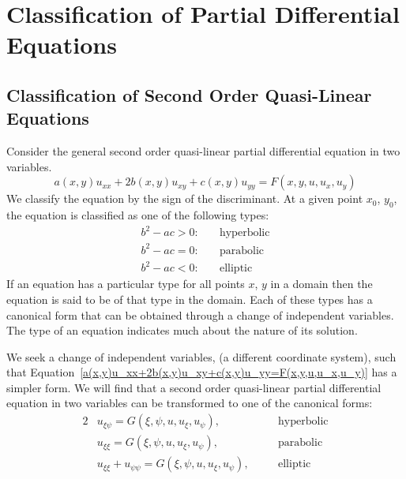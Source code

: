 \flushbottom




\chapter{Classification of Partial Differential Equations}








\section{Classification of Second Order Quasi-Linear Equations}





Consider the general second order quasi-linear partial differential 
equation in two variables.
\begin{equation}
  \label{a(x,y)u_xx+2b(x,y)u_xy+c(x,y)u_yy=F(x,y,u,u_x,u_y)}
  a(x,y) u_{x x} + 2 b(x,y) u_{x y} + c(x,y) u_{y y} = F(x, y, u, u_x, u_y)
\end{equation}
We classify the equation by the sign of the discriminant.
At a given point $x_0$, $y_0$, the equation is classified as one 
of the following types:
\[
\begin{matrix}
  b^2 - a c > 0: \quad &\mathrm{hyperbolic} 
  \\
  b^2 - a c = 0: \quad &\mathrm{parabolic} 
  \\
  b^2 - a c < 0: \quad &\mathrm{elliptic} 
\end{matrix}
\]
If an equation has a particular type for all points $x$, $y$ in a domain
then the equation is said to be of that type in the domain.
Each of these types has a canonical form that can be obtained through
a change of independent variables.  The type of an equation indicates
much about the nature of its solution.

We seek a change of independent variables, (a different coordinate 
system), such that 
Equation~\ref{a(x,y)u_xx+2b(x,y)u_xy+c(x,y)u_yy=F(x,y,u,u_x,u_y)}
has a simpler form.  We will find that a second order quasi-linear
partial differential equation in two variables can be transformed to
one of the canonical forms:
\begin{alignat*}{2}
  &u_{\xi \psi} = G(\xi, \psi, u, u_\xi, u_\psi), &\quad &\mathrm{hyperbolic} 
  \\
  &u_{\xi \xi} = G(\xi, \psi, u, u_\xi, u_\psi), &\quad &\mathrm{parabolic} 
  \\
  &u_{\xi \xi} + u_{\psi \psi} = G(\xi, \psi, u, u_\xi, u_\psi), &\quad &\mathrm{elliptic}
\end{alignat*}


